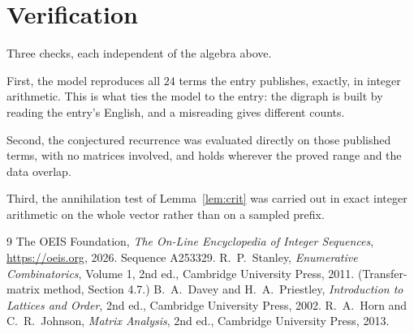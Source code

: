 \documentclass[11pt,a4paper]{article}
\theoremstyle{plain}
\theoremstyle{definition}
\begin{document}
\section{Verification}

Three checks, each independent of the algebra above.

First, the model reproduces all $24$ terms the entry publishes, exactly, in integer
arithmetic. This is what ties the model to the entry: the digraph is built by reading the
entry's English, and a misreading gives different counts.

Second, the conjectured recurrence was evaluated directly on those published terms, with no
matrices involved, and holds wherever the proved range and the data overlap.

Third, the annihilation test of Lemma~\ref{lem:crit} was carried out in exact integer
arithmetic on the whole vector rather than on a sampled prefix.

\begin{thebibliography}{9}
 The OEIS Foundation, \emph{The On-Line Encyclopedia of Integer
Sequences}, \url{https://oeis.org}, 2026. Sequence A253329.
 R.~P.~Stanley, \emph{Enumerative Combinatorics}, Volume 1, 2nd ed.,
Cambridge University Press, 2011. (Transfer-matrix method, Section 4.7.)
 B.~A.~Davey and H.~A.~Priestley, \emph{Introduction to Lattices and
Order}, 2nd ed., Cambridge University Press, 2002.
 R.~A.~Horn and C.~R.~Johnson, \emph{Matrix Analysis}, 2nd ed., Cambridge
University Press, 2013.
\end{thebibliography}
\end{document}
